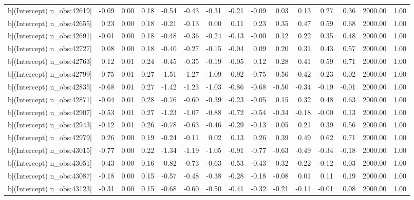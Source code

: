 \begin{table}[ht]
\begin{tabular}{rrrrrrrrrrrrrrr}
  b[(Intercept) n\_obs:42619] & -0.09 & 0.00 & 0.18 & -0.54 & -0.43 & -0.31 & -0.21 & -0.09 & 0.03 & 0.13 & 0.27 & 0.36 & 2000.00 & 1.00 \\ 
  b[(Intercept) n\_obs:42655] & 0.23 & 0.00 & 0.18 & -0.21 & -0.13 & 0.00 & 0.11 & 0.23 & 0.35 & 0.47 & 0.59 & 0.68 & 2000.00 & 1.00 \\ 
  b[(Intercept) n\_obs:42691] & -0.01 & 0.00 & 0.18 & -0.48 & -0.36 & -0.24 & -0.13 & -0.00 & 0.12 & 0.22 & 0.35 & 0.48 & 2000.00 & 1.00 \\ 
  b[(Intercept) n\_obs:42727] & 0.08 & 0.00 & 0.18 & -0.40 & -0.27 & -0.15 & -0.04 & 0.09 & 0.20 & 0.31 & 0.43 & 0.57 & 2000.00 & 1.00 \\ 
  b[(Intercept) n\_obs:42763] & 0.12 & 0.01 & 0.24 & -0.45 & -0.35 & -0.19 & -0.05 & 0.12 & 0.28 & 0.41 & 0.59 & 0.71 & 2000.00 & 1.00 \\ 
  b[(Intercept) n\_obs:42799] & -0.75 & 0.01 & 0.27 & -1.51 & -1.27 & -1.09 & -0.92 & -0.75 & -0.56 & -0.42 & -0.23 & -0.02 & 2000.00 & 1.00 \\ 
  b[(Intercept) n\_obs:42835] & -0.68 & 0.01 & 0.27 & -1.42 & -1.23 & -1.03 & -0.86 & -0.68 & -0.50 & -0.34 & -0.19 & -0.01 & 2000.00 & 1.00 \\ 
  b[(Intercept) n\_obs:42871] & -0.04 & 0.01 & 0.28 & -0.76 & -0.60 & -0.39 & -0.23 & -0.05 & 0.15 & 0.32 & 0.48 & 0.63 & 2000.00 & 1.00 \\ 
  b[(Intercept) n\_obs:42907] & -0.53 & 0.01 & 0.27 & -1.23 & -1.07 & -0.88 & -0.72 & -0.54 & -0.34 & -0.18 & -0.00 & 0.13 & 2000.00 & 1.00 \\ 
  b[(Intercept) n\_obs:42943] & -0.12 & 0.01 & 0.26 & -0.78 & -0.63 & -0.46 & -0.29 & -0.13 & 0.05 & 0.21 & 0.39 & 0.56 & 2000.00 & 1.00 \\ 
  b[(Intercept) n\_obs:42979] & 0.26 & 0.00 & 0.19 & -0.24 & -0.11 & 0.02 & 0.13 & 0.26 & 0.39 & 0.49 & 0.62 & 0.71 & 2000.00 & 1.00 \\ 
  b[(Intercept) n\_obs:43015] & -0.77 & 0.00 & 0.22 & -1.34 & -1.19 & -1.05 & -0.91 & -0.77 & -0.63 & -0.49 & -0.34 & -0.18 & 2000.00 & 1.00 \\ 
  b[(Intercept) n\_obs:43051] & -0.43 & 0.00 & 0.16 & -0.82 & -0.73 & -0.63 & -0.53 & -0.43 & -0.32 & -0.22 & -0.12 & -0.03 & 2000.00 & 1.00 \\ 
  b[(Intercept) n\_obs:43087] & -0.18 & 0.00 & 0.15 & -0.57 & -0.48 & -0.38 & -0.28 & -0.18 & -0.08 & 0.01 & 0.11 & 0.19 & 2000.00 & 1.00 \\ 
  b[(Intercept) n\_obs:43123] & -0.31 & 0.00 & 0.15 & -0.68 & -0.60 & -0.50 & -0.41 & -0.32 & -0.21 & -0.11 & -0.01 & 0.08 & 2000.00 & 1.00 \\ 

\end{tabular}
\end{table}
